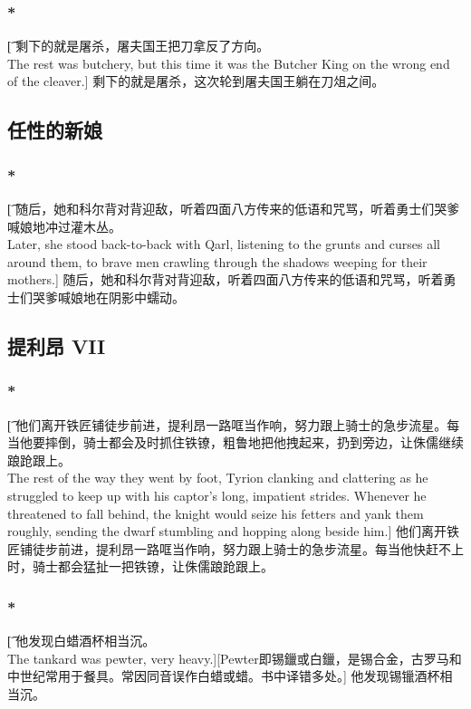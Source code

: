 \documentclass[12pt,a4paper]{article}
\begin{document}
\subsubsection{\color{red}*}\t[		
	剩下的就是屠杀，屠夫国王把刀拿反了方向。\\
	The rest was butchery, but this time it was the Butcher King on the wrong end of the cleaver.]
	剩下的就是屠杀，这次轮到屠夫国王躺在刀俎之间。
	
\subsection{任性的新娘}
\subsubsection{\color{red}*}\t[
	随后，她和科尔背对背迎敌，听着四面八方传来的低语和咒骂，听着勇士们哭爹喊娘地冲过灌木丛。\\
	Later, she stood back-to-back with Qarl, listening to the grunts and curses all around them, to brave men crawling through the shadows weeping for their mothers.]
	随后，她和科尔背对背迎敌，听着四面八方传来的低语和咒骂，听着勇士们哭爹喊娘地在阴影中蠕动。
	

\subsection{提利昂 VII}
\subsubsection{\color{red}*}\t[
	他们离开铁匠铺徒步前进，提利昂一路哐当作响，努力跟上骑士的急步流星。每当他要摔倒，骑士都会及时抓住铁镣，粗鲁地把他拽起来，扔到旁边，让侏儒继续踉跄跟上。\\
	The rest of the way they went by foot, Tyrion clanking and clattering as he struggled to keep up with his captor's long, impatient strides. Whenever he threatened to fall behind, the knight would seize his fetters and yank them roughly, sending the dwarf stumbling and hopping along beside him.]
	他们离开铁匠铺徒步前进，提利昂一路哐当作响，努力跟上骑士的急步流星。每当他快赶不上时，骑士都会猛扯一把铁镣，让侏儒踉跄跟上。
	
\subsubsection{\color{red}*}\t[
	他发现白蜡酒杯相当沉。\\
	The tankard was pewter, very heavy.][Pewter即锡鑞或白鑞，是锡合金，古罗马和中世纪常用于餐具。常因同音误作白蜡或蜡。书中译错多处。]
	他发现锡镴酒杯相当沉。
	
\end{document}
